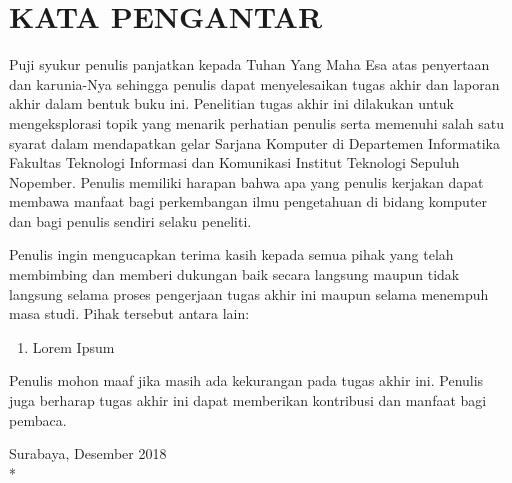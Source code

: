 \chapter {KATA PENGANTAR}

Puji syukur penulis panjatkan kepada Tuhan Yang Maha Esa atas penyertaan dan karunia-Nya sehingga penulis dapat menyelesaikan tugas akhir dan laporan akhir dalam bentuk buku ini. Penelitian tugas akhir ini dilakukan untuk mengeksplorasi topik yang menarik perhatian penulis serta memenuhi salah satu syarat dalam mendapatkan gelar Sarjana Komputer di Departemen Informatika Fakultas Teknologi Informasi dan Komunikasi Institut Teknologi Sepuluh Nopember. Penulis memiliki harapan bahwa apa yang penulis kerjakan dapat membawa manfaat bagi perkembangan ilmu pengetahuan di bidang komputer dan bagi penulis sendiri selaku peneliti.

Penulis ingin mengucapkan terima kasih kepada semua pihak yang telah membimbing dan memberi dukungan baik secara langsung maupun tidak langsung selama proses pengerjaan tugas akhir ini maupun selama menempuh masa studi. Pihak tersebut antara lain:

\begin {enumerate}
    \item Lorem Ipsum
\end {enumerate}

Penulis mohon maaf jika masih ada kekurangan pada tugas akhir ini. Penulis juga berharap tugas akhir ini dapat memberikan kontribusi dan manfaat bagi pembaca.

\begin{flushright}
Surabaya, Desember 2018 \\*
\vspace{5em}
\penulis
\end{flushright}